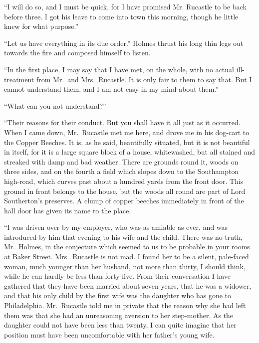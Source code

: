“I will do so, and I must be quick, for I have promised Mr.
Rucastle to be back before three. I got his leave to come
into town this morning, though he little knew for what
purpose.”

“Let us have everything in its due order.” Holmes thrust
his long thin legs out towards the fire and composed himself
to listen.

“In the first place, I may say that I have met, on the whole,
with no actual ill-treatment from Mr.~and Mrs.~Rucastle. It
is only fair to them to say that. But I cannot understand
them, and I am not easy in my mind about them.”

“What can you not understand?”

“Their reasons for their conduct. But you shall have it all
just as it occurred. When I came down, Mr.~Rucastle met me
here, and drove me in his dog-cart to the Copper Beeches. It
is, as he said, beautifully situated, but it is not beautiful in
itself, for it is a large square block of a house, whitewashed,
but all stained and streaked with damp and bad weather.
There are grounds round it, woods on three sides, and on the
fourth a field which slopes down to the Southampton high-road,
which curves past about a hundred yards from the front door.
This ground in front belongs to the house, but the woods all
round are part of Lord Southerton’s preserves. A clump of
copper beeches immediately in front of the hall door has given
its name to the place.

“I was driven over by my employer, who was as amiable as
ever, and was introduced by him that evening to his wife and
the child. There was no truth, Mr.~Holmes, in the conjecture
which seemed to us to be probable in your rooms at Baker
Street. Mrs.~Rucastle is not mad. I found her to be a silent,
pale-faced woman, much younger than her husband, not more
than thirty, I should think, while he can hardly be less than
forty-five. From their conversation I have gathered that they
have been married about seven years, that he was a widower,
and that his only child by the first wife was the daughter who
has gone to Philadelphia. Mr.~Rucastle told me in private
that the reason why she had left them was that she had an
unreasoning aversion to her step-mother. As the daughter
could not have been less than twenty, I can quite imagine that
her position must have been uncomfortable with her father’s
young wife.

